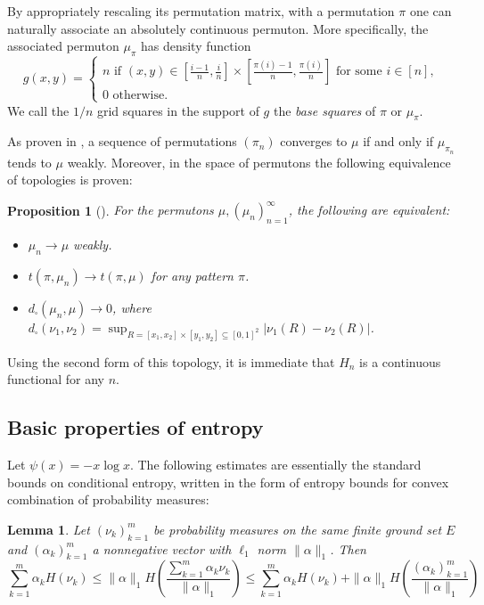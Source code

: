 \documentclass[11pt]{article}
\newtheorem{lemma}[theorem]{Lemma}
\newtheorem{prop}[theorem]{Proposition}
\theoremstyle{definition}
\begin{document}
By appropriately rescaling its permutation matrix, with a permutation $\pi$ one can naturally associate an absolutely continuous permuton. More specifically, the associated permuton $\mu_\pi$ has density function
\[
g(x, y) =
\begin{cases}
    n\text{ if } (x, y)\in \left[\frac{i-1}{n}, \frac{i}{n}\right] \times \left[\frac{\pi(i)-1}{n}, \frac{\pi(i)}{n}\right]\text{ for some $i\in[n]$},\\
    0\text{ otherwise.}
\end{cases}
\]
We call the $1/n$ grid squares in the support of $g$ the \textit{base squares} of $\pi$ or $\mu_\pi$.

As proven in \cite{HOPPEN201393}, a sequence of permutations $(\pi_n)$ converges to $\mu$ if and only if $\mu_{\pi_n}$ tends to $\mu$ weakly. Moreover, in the space of permutons the following equivalence of topologies is proven:

\begin{prop}[{{\cite[Lemma~5.3]{HOPPEN201393}}}]\label{prop:equiv_topologies}
    For the permutons $\mu, (\mu_n)_{n=1}^{\infty}$, the following are equivalent:
    \begin{itemize}
        \item $\mu_n\to \mu$ weakly.
        \item $t(\pi, \mu_n)\to t(\pi, \mu)$ for any pattern $\pi$.
        \item $d_{\square}(\mu_n, \mu)\to 0$, where $d_{\square}(\nu_1, \nu_2) = \sup_{R=[x_1, x_2]\times [y_1, y_2]\subseteq[0,1]^2} |\nu_1(R)-\nu_2(R)|$.
    \end{itemize}
\end{prop}

Using the second form of this topology, it is immediate that $H_n$ is a continuous functional for any $n$.

\subsection{Basic properties of entropy}

Let $\psi(x)=-x\log x$. The following estimates are essentially the standard bounds on conditional entropy, written in the form of entropy bounds for convex combination of probability measures:
\begin{lemma}\label{lemma:basic_entropy_estimates}
Let $(\nu_k)_{k=1}^{m}$ be probability measures on the same finite ground set $E$ and $(\alpha_k)_{k=1}^{m}$ a nonnegative vector with $\ell_1$ norm $\|\alpha\|_1$. Then
$$\sum_{k=1}^{m}{\alpha_k}H(\nu_k)\leq \|\alpha\|_1 H\left(\frac{\sum_{k=1}^{m}{\alpha_k}\nu_k}{\|\alpha\|_1}\right)\leq \sum_{k=1}^{m}{\alpha_k}H(\nu_k) +\|\alpha\|_1 H\left(\frac{(\alpha_k)_{k=1}^m}{\|\alpha\|_1}\right)$$
\end{lemma}
\end{document}
